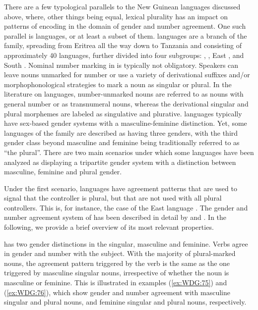 \documentclass[output=collectionpaper]{langsci/langscibook}
\begin{document}
There are a few typological parallels to the New Guinean languages discussed above, where, other things being equal, lexical plurality has an impact on patterns of encoding in the domain of gender and number agreement. One such parallel is  languages, or at least a subset of them.  languages are a branch of the  family, spreading from Eritrea all the way down to Tanzania and consisting of approximately 40 languages, further divided into four subgroups: , , East , and South . Nominal number marking in  is typically not obligatory. Speakers can leave nouns unmarked for number or use a variety of derivational suffixes and/or morphophonological strategies to mark a noun as singular or plural. In the literature on  languages, number-unmarked nouns are referred to as nouns with general number or as transnumeral nouns, whereas the derivational singular and plural morphemes are labeled as singulative and plurative.  languages typically have sex-based gender systems with a masculine-feminine distinction. Yet, some languages of the family are described as having three genders, with the third gender class beyond masculine and feminine being traditionally referred to as ``the plural''. There are two main scenarios under which some  languages have been analyzed as displaying a tripartite gender system with a distinction between masculine, feminine and plural gender.

Under the first scenario, languages have agreement patterns that are used to signal that the controller is plural, but that are not used with all plural controllers. This is, for instance, the case of the East  language . The gender and number agreement system of  has been described in detail by \cite{Corbett1987} and \cite{Corbett2000}. In the following, we provide a brief overview of its most relevant properties.

 has two gender distinctions in the singular, masculine and feminine. Verbs agree in gender and number with the subject. With the majority of plural-marked nouns, the agreement pattern triggered by the verb is the same as the one triggered by masculine singular nouns, irrespective of whether the noun is masculine or feminine. This is illustrated in examples (\ref{ex:WDG:75}) and (\ref{ex:WDG:76}), which show gender and number agreement with masculine singular and plural nouns, and feminine singular and plural nouns, respectively.
\end{document}
